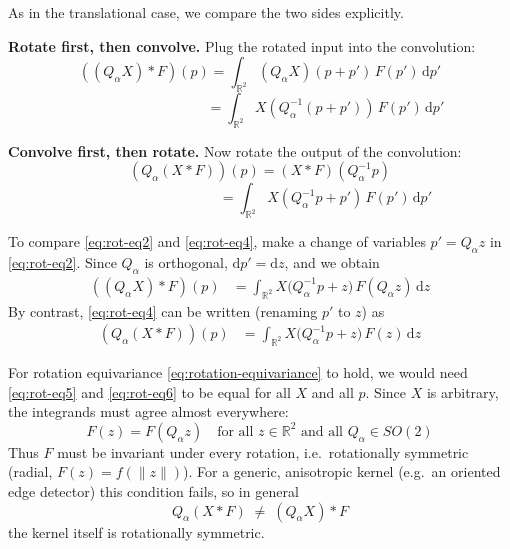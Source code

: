 \documentclass[12pt]{article}
\begin{document}
  As in the translational case, we compare the two sides explicitly.
  
 \textbf{Rotate first, then convolve.}
 Plug the rotated input into the convolution:
 \begin{equation}
   \label{eq:rot-eq1}
   ((Q_\alpha X) * F)(p)
     = \int_{\mathbb{R}^2} (Q_\alpha X)(p + p')\,F(p')\,\mathrm{d}p'
 \end{equation}
 \begin{equation}
   \label{eq:rot-eq2}
   \phantom{((Q_\alpha X) * F)(p)}
     = \int_{\mathbb{R}^2} X(Q_\alpha^{-1}(p + p'))\,F(p')\,\mathrm{d}p'
 \end{equation}
 
 \textbf{Convolve first, then rotate.}
 Now rotate the output of the convolution:
 \begin{equation}
   \label{eq:rot-eq3}
   (Q_\alpha (X * F))(p)
     = (X * F)(Q_\alpha^{-1} p)
 \end{equation}
 \begin{equation}
   \label{eq:rot-eq4}
   \phantom{(Q_\alpha (X * F))(p)}
     = \int_{\mathbb{R}^2} X(Q_\alpha^{-1} p + p')\,F(p')\,\mathrm{d}p'
 \end{equation}
  
  To compare \eqref{eq:rot-eq2} and \eqref{eq:rot-eq4}, make a change of
  variables $p' = Q_\alpha z$ in \eqref{eq:rot-eq2}. Since $Q_\alpha$ is orthogonal,
  $\mathrm{d}p' = \mathrm{d}z$, and we obtain
  \begin{align}
    \label{eq:rot-eq5}
    ((Q_\alpha X) * F)(p)
      &= \int_{\mathbb{R}^2} X\bigl(Q_\alpha^{-1} p + z\bigr)\,F(Q_\alpha z)\,\mathrm{d}z
  \end{align}
  By contrast, \eqref{eq:rot-eq4} can be written (renaming $p'$ to $z$) as
  \begin{align}
    \label{eq:rot-eq6}
    (Q_\alpha (X * F))(p)
      &= \int_{\mathbb{R}^2} X\bigl(Q_\alpha^{-1} p + z\bigr)\,F(z)\,\mathrm{d}z
  \end{align}
  
  For rotation equivariance \eqref{eq:rotation-equivariance} to hold, we would
  need \eqref{eq:rot-eq5} and \eqref{eq:rot-eq6} to be equal for all $X$ and
  all $p$. Since $X$ is arbitrary, the integrands must agree almost everywhere:
  \begin{equation}
    \label{eq:rot-condition}
    F(z) = F(Q_\alpha z)
    \quad\text{for all }z\in\mathbb{R}^2\text{ and all }Q_\alpha\in SO(2)
  \end{equation}
  Thus $F$ must be invariant under every rotation, i.e.\ rotationally
  symmetric (radial, $F(z) = f(\|z\|)$). For a generic, anisotropic kernel
  (e.g.\ an oriented edge detector) this condition fails, so in general
  \begin{equation}
    Q_\alpha(X * F) \;\neq\; (Q_\alpha X) * F
  \end{equation}
the kernel itself is rotationally symmetric.
  
\end{document}
